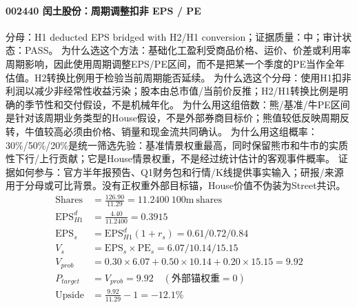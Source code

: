 \paragraph{002440 闰土股份：周期调整扣非 EPS / PE}
分母：H1 deducted EPS bridged with H2/H1 conversion；证据质量：中；审计状态：PASS。
为什么选这个方法：基础化工盈利受商品价格、运价、价差或利用率周期影响，因此使用周期调整EPS/PE区间，而不是把某一个季度的PE当作全年估值。H2转换比例用于检验当前周期能否延续。
为什么选这个分母：使用H1扣非利润以减少非经常性收益污染；股本由总市值/当前价反推；H2/H1转换比例是明确的季节性和交付假设，不是机械年化。
为什么用这组倍数：熊/基准/牛PE区间是针对该周期业务类型的House假设，不是外部券商目标价；熊值较低反映周期反转，牛值较高必须由价格、销量和现金流共同确认。
为什么用这组概率：30\%/50\%/20\%是统一筛选先验：基准情景权重最高，同时保留熊市和牛市的实质性下行/上行贡献；它是House情景权重，不是经过统计估计的客观事件概率。
证据如何参与：官方半年报预告、Q1财务包和行情/K线提供事实输入；研报/来源用于分母或可比背景。没有正权重外部目标锚，House价值不伪装为Street共识。
\begin{align*}
\mathrm{Shares} &= \frac{126.90}{11.29}=11.2400\ \mathrm{100m\ shares}\\
\mathrm{EPS}_{H1}^d &= \frac{4.40}{11.2400}=0.3915\\
\mathrm{EPS}_s &= \mathrm{EPS}_{H1}^d(1+r_s)=0.61/0.72/0.84\\
V_s &= \mathrm{EPS}_s\times \mathrm{PE}_s=6.07/10.14/15.15\\
V_{prob} &= 0.30\times 6.07+0.50\times 10.14+0.20\times 15.15=9.92\\
P_{target} &= V_{prob}=9.92\quad(\text{外部锚权重}=0)\\
\mathrm{Upside} &= \frac{9.92}{11.29}-1=-12.1\%\\
\end{align*}

